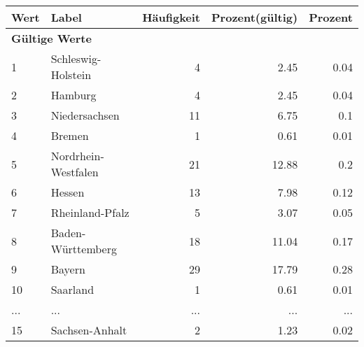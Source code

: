      \begin{longtable}{lXrrr}
     \toprule
     \textbf{Wert} & \textbf{Label} & \textbf{Häufigkeit} & \textbf{Prozent(gültig)} & \textbf{Prozent} \\
     \endhead
     \midrule
     \multicolumn{5}{l}{\textbf{Gültige Werte}}\\
        1 & \multicolumn{1}{X}{Schleswig-Holstein} & %
          \num{4} &
          \num[round-mode=places,round-precision=2]{2.45} &
          \num[round-mode=places,round-precision=2]{0.04} \\
        2 & \multicolumn{1}{X}{Hamburg} & %
          \num{4} &
          \num[round-mode=places,round-precision=2]{2.45} &
          \num[round-mode=places,round-precision=2]{0.04} \\
        3 & \multicolumn{1}{X}{Niedersachsen} & %
          \num{11} &
          \num[round-mode=places,round-precision=2]{6.75} &
          \num[round-mode=places,round-precision=2]{0.1} \\
        4 & \multicolumn{1}{X}{Bremen} & %
          \num{1} &
          \num[round-mode=places,round-precision=2]{0.61} &
          \num[round-mode=places,round-precision=2]{0.01} \\
        5 & \multicolumn{1}{X}{Nordrhein-Westfalen} & %
          \num{21} &
          \num[round-mode=places,round-precision=2]{12.88} &
          \num[round-mode=places,round-precision=2]{0.2} \\
        6 & \multicolumn{1}{X}{Hessen} & %
          \num{13} &
          \num[round-mode=places,round-precision=2]{7.98} &
          \num[round-mode=places,round-precision=2]{0.12} \\
        7 & \multicolumn{1}{X}{Rheinland-Pfalz} & %
          \num{5} &
          \num[round-mode=places,round-precision=2]{3.07} &
          \num[round-mode=places,round-precision=2]{0.05} \\
        8 & \multicolumn{1}{X}{Baden-Württemberg} & %
          \num{18} &
          \num[round-mode=places,round-precision=2]{11.04} &
          \num[round-mode=places,round-precision=2]{0.17} \\
        9 & \multicolumn{1}{X}{Bayern} & %
          \num{29} &
          \num[round-mode=places,round-precision=2]{17.79} &
          \num[round-mode=places,round-precision=2]{0.28} \\
        10 & \multicolumn{1}{X}{Saarland} & %
          \num{1} &
          \num[round-mode=places,round-precision=2]{0.61} &
          \num[round-mode=places,round-precision=2]{0.01} \\
       ... & ... & ... & ... & ... \\
        15 & \multicolumn{1}{X}{Sachsen-Anhalt} & %
          \num{2} &
          \num[round-mode=places,round-precision=2]{1.23} &
          \num[round-mode=places,round-precision=2]{0.02} \\


\end{longtable}
